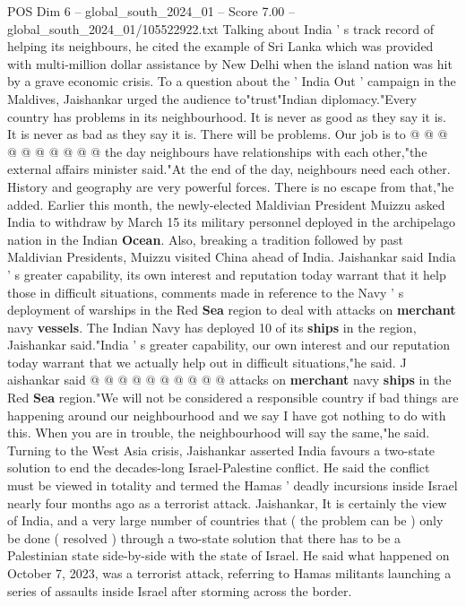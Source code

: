 \begin{textsample}{POS Dim 6 – global\_south\_2024\_01 – Score 7.00 – global\_south\_2024\_01/105522922.txt}
Talking about India ' s track record of helping its neighbours, he cited the example of Sri Lanka which was provided with multi-million dollar assistance by New Delhi when the island nation was hit by a grave economic crisis.
To a question about the ' India Out ' campaign in the Maldives, Jaishankar urged the audience to"trust"Indian diplomacy."Every country has problems in its neighbourhood.
It is never as good as they say it is.
It is never as bad as they say it is.
There will be problems.
Our job is to @ @ @ @ @ @ @ @ @ @ the day neighbours have relationships with each other,"the external affairs minister said."At the end of the day, neighbours need each other.
History and geography are very powerful forces.
There is no escape from that,"he added.
Earlier this month, the newly-elected Maldivian President Muizzu asked India to withdraw by March 15 its military personnel deployed in the archipelago nation in the Indian \textbf{Ocean}.
Also, breaking a tradition followed by past Maldivian Presidents, Muizzu visited China ahead of India.
Jaishankar said India ' s greater capability, its own interest and reputation today warrant that it help those in difficult situations, comments made in reference to the Navy ' s deployment of warships in the Red \textbf{Sea} region to deal with attacks on \textbf{merchant} navy \textbf{vessels}.
The Indian Navy has deployed 10 of its \textbf{ships} in the region, Jaishankar said."India ' s greater capability, our own interest and our reputation today warrant that we actually help out in difficult situations,"he said.
J aishankar said @ @ @ @ @ @ @ @ @ @ attacks on \textbf{merchant} navy \textbf{ships} in the Red \textbf{Sea} region."We will not be considered a responsible country if bad things are happening around our neighbourhood and we say I have got nothing to do with this.
When you are in trouble, the neighbourhood will say the same,"he said.
Turning to the West Asia crisis, Jaishankar asserted India favours a two-state solution to end the decades-long Israel-Palestine conflict.
He said the conflict must be viewed in totality and termed the Hamas ' deadly incursions inside Israel nearly four months ago as a terrorist attack.
Jaishankar, It is certainly the view of India, and a very large number of countries that ( the problem can be ) only be done ( resolved ) through a two-state solution that there has to be a Palestinian state side-by-side with the state of Israel.
He said what happened on October 7, 2023, was a terrorist attack, referring to Hamas militants launching a series of assaults inside Israel after storming across the border.

\end{textsample}
